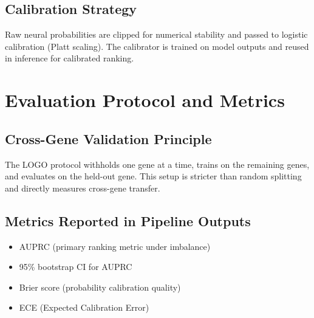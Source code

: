 \documentclass[11pt,a4paper]{article}
\begin{document}
\subsection{Calibration Strategy}
Raw neural probabilities are clipped for numerical stability and passed to logistic calibration (Platt scaling). The calibrator is trained on model outputs and reused in inference for calibrated ranking.

\section{Evaluation Protocol and Metrics}
\subsection{Cross-Gene Validation Principle}
The LOGO protocol withholds one gene at a time, trains on the remaining genes, and evaluates on the held-out gene. This setup is stricter than random splitting and directly measures cross-gene transfer.

\subsection{Metrics Reported in Pipeline Outputs}
\begin{itemize}[leftmargin=1.2cm]
    \item AUPRC (primary ranking metric under imbalance)
    \item 95\% bootstrap CI for AUPRC
    \item Brier score (probability calibration quality)
    \item ECE (Expected Calibration Error)
\end{itemize}
\end{document}
